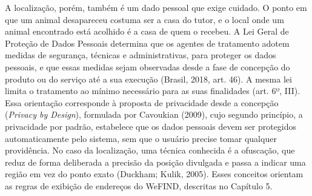 A localização, porém, também é um dado pessoal que exige cuidado. O ponto em que um animal desapareceu costuma ser a casa do tutor, e o local onde um animal encontrado está acolhido é a casa de quem o recebeu. A Lei Geral de Proteção de Dados Pessoais determina que os agentes de tratamento adotem medidas de segurança, técnicas e administrativas, para proteger os dados pessoais, e que essas medidas sejam observadas desde a fase de concepção do produto ou do serviço até a sua execução (Brasil, 2018, art. 46). A mesma lei limita o tratamento ao mínimo necessário para as suas finalidades (art. 6º, III). Essa orientação corresponde à proposta de privacidade desde a concepção (\textit{Privacy by Design}), formulada por Cavoukian (2009), cujo segundo princípio, a privacidade por padrão, estabelece que os dados pessoais devem ser protegidos automaticamente pelo sistema, sem que o usuário precise tomar qualquer providência. No caso da localização, uma técnica conhecida é a ofuscação, que reduz de forma deliberada a precisão da posição divulgada e passa a indicar uma região em vez do ponto exato (Duckham; Kulik, 2005). Esses conceitos orientam as regras de exibição de endereços do WeFIND, descritas no Capítulo 5.
